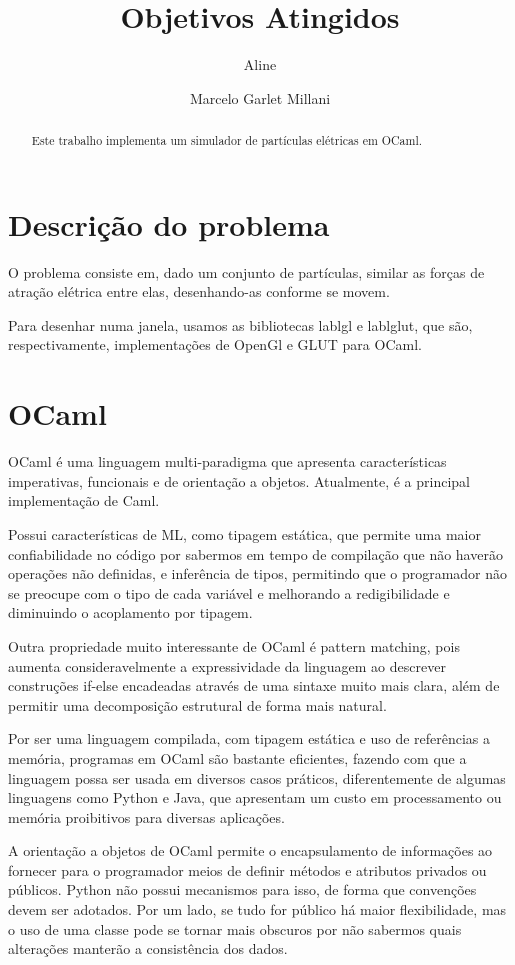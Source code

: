 \documentclass[a4paper,10pt]{article}
\title{Objetivos Atingidos}
\author{Aline \and Marcelo Garlet Millani}
\begin{document}
\maketitle

\begin{abstract}
 Este trabalho implementa um simulador de partículas elétricas em OCaml.
\end{abstract}

\section{Descrição do problema}

	O problema consiste em, dado um conjunto de partículas, similar as forças de atração elétrica entre elas, desenhando-as conforme se movem.
	
	Para desenhar numa janela, usamos as bibliotecas lablgl e lablglut, que são, respectivamente, implementações de OpenGl e GLUT para OCaml.
	
\section{OCaml}

	OCaml é uma linguagem multi-paradigma que apresenta características imperativas, funcionais e de orientação a objetos. Atualmente, é a principal implementação de Caml.
	
	Possui características de ML, como tipagem estática, que permite uma maior confiabilidade no código por sabermos em tempo de compilação que não haverão operações não definidas, e inferência de tipos, permitindo que o programador não se preocupe com o tipo de cada variável e melhorando a redigibilidade e diminuindo o acoplamento por tipagem.
	
	Outra propriedade muito interessante de OCaml é pattern matching, pois aumenta consideravelmente a expressividade da linguagem ao descrever construções if-else encadeadas através de uma sintaxe muito mais clara, além de permitir uma decomposição estrutural de forma mais natural.
	
	Por ser uma linguagem compilada, com tipagem estática e uso de referências a memória, programas em OCaml são bastante eficientes, fazendo com que a linguagem possa ser usada em diversos casos práticos, diferentemente de algumas linguagens como Python e Java, que apresentam um custo em processamento ou memória proibitivos para diversas aplicações.
	
	A orientação a objetos de OCaml permite o encapsulamento de informações ao fornecer para o programador meios de definir métodos e atributos privados ou públicos. Python não possui mecanismos para isso, de forma que convenções devem ser adotados. Por um lado, se tudo for público há maior flexibilidade, mas o uso de uma classe pode se tornar mais obscuros por não sabermos quais alterações manterão a consistência dos dados.
	
\end{document}
